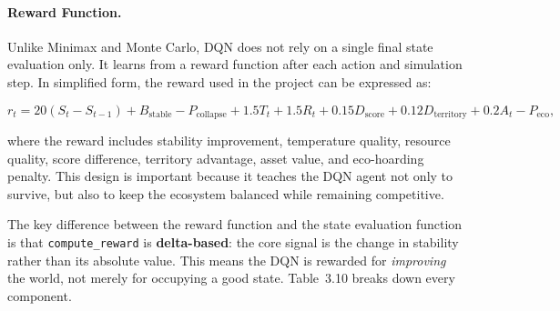 \documentclass[12pt,a4paper]{article}
\begin{document}
\paragraph{Reward Function.}
Unlike Minimax and Monte Carlo, DQN does not rely on a single final state evaluation only. It learns from a reward function after each action and simulation step. In simplified form, the reward used in the project can be expressed as:

\begin{equation}
r_t = 20(S_t - S_{t-1}) + B_{\text{stable}} - P_{\text{collapse}} + 1.5T_t + 1.5R_t + 0.15D_{\text{score}} + 0.12D_{\text{territory}} + 0.2A_t - P_{\text{eco}},
\end{equation}

where the reward includes stability improvement, temperature quality, resource quality, score difference, territory advantage, asset value, and eco-hoarding penalty. This design is important because it teaches the DQN agent not only to survive, but also to keep the ecosystem balanced while remaining competitive.

The key difference between the reward function and the state evaluation function is that \texttt{compute\_reward} is \textbf{delta-based}: the core signal is the change in stability rather than its absolute value. This means the DQN is rewarded for \emph{improving} the world, not merely for occupying a good state. Table~3.10 breaks down every component.
\end{document}
